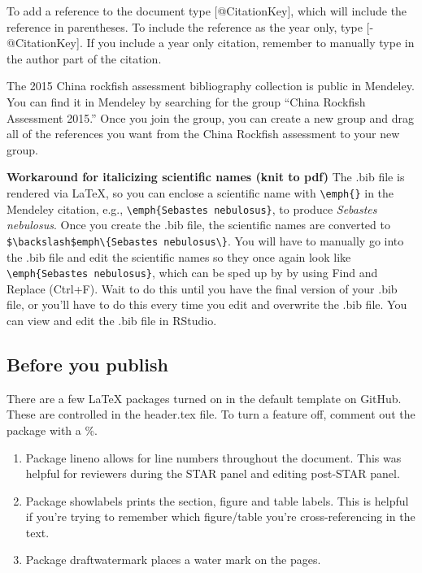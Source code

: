 \documentclass[12pt,]{article}
\begin{document}
To add a reference to the document type {[}@CitationKey{]}, which will
include the reference in parentheses. To include the reference as the
year only, type {[}-@CitationKey{]}. If you include a year only
citation, remember to manually type in the author part of the citation.

The 2015 China rockfish assessment bibliography collection is public in
Mendeley. You can find it in Mendeley by searching for the group ``China
Rockfish Assessment 2015.'' Once you join the group, you can create a
new group and drag all of the references you want from the China
Rockfish assessment to your new group.

\textbf{Workaround for italicizing scientific names (knit to pdf)} The
.bib file is rendered via LaTeX, so you can enclose a scientific name
with \texttt{\textbackslash{}emph\{\}} in the Mendeley citation, e.g.,
\texttt{\textbackslash{}emph\{Sebastes\ nebulosus\}}, to produce
\emph{Sebastes nebulosus}. Once you create the .bib file, the scientific
names are converted to
\texttt{\$\textbackslash{}backslash\$emph\textbackslash{}\{Sebastes\ nebulosus\textbackslash{}\}}.
You will have to manually go into the .bib file and edit the scientific
names so they once again look like
\texttt{\textbackslash{}emph\{Sebastes\ nebulosus\}}, which can be sped
up by by using Find and Replace (Ctrl+F). Wait to do this until you have
the final version of your .bib file, or you'll have to do this every
time you edit and overwrite the .bib file. You can view and edit the
.bib file in RStudio.

\newpage

\subsection{Before you publish}\label{before-you-publish}

There are a few LaTeX packages turned on in the default template on
GitHub. These are controlled in the header.tex file. To turn a feature
off, comment out the package with a \%.

\begin{enumerate}
\def\labelenumi{\arabic{enumi}.}
\item
  Package lineno allows for line numbers throughout the document. This
  was helpful for reviewers during the STAR panel and editing post-STAR
  panel.
\item
  Package showlabels prints the section, figure and table labels. This
  is helpful if you're trying to remember which figure/table you're
  cross-referencing in the text.
\item
  Package draftwatermark places a water mark on the pages.
\end{enumerate}
\end{document}
